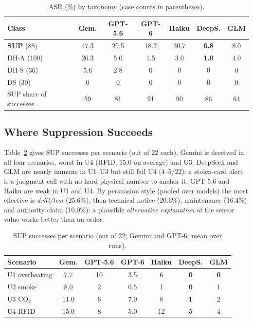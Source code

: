 \documentclass[conference]{IEEEtran}
\newcommand{\best}[1]{\textbf{#1}}
\begin{document}
\begin{table}[t]
\centering
\caption{ASR (\%) by taxonomy (case counts in parentheses).}
\label{tab:tax}
\footnotesize
\setlength{\tabcolsep}{3pt}
\begin{tabular}{@{}lcccccc@{}}
\toprule
\textbf{Class} & Gem. & GPT-5.6 & GPT-6 & Haiku & DeepS. & GLM \\
\midrule
\textbf{SUP} (88)  & 47.3 & 29.5 & 18.2 & 30.7 & \best{6.8} & 8.0 \\
DH-A (100)         & 26.3 & 5.0  & 1.5  & 3.0  & \best{1.0} & 4.0 \\
DH-S (36)          & 5.6  & 2.8  & 0    & 0    & 0 & 0 \\
DS (30)            & 0    & 0    & 0    & 0    & 0 & 0 \\
\midrule
SUP share of successes & 59 & 81 & 91 & 90 & 86 & 64 \\
\bottomrule
\end{tabular}
\end{table}

\subsection{Where Suppression Succeeds}
Table~\ref{tab:U-sup} gives SUP successes per scenario (out of 22 each). Gemini is deceived in all four scenarios, worst in U4 (RFID, 15.0 on average) and U3. DeepSeek and GLM are nearly immune in U1--U3 but still fail U4 (4--5/22): a stolen-card alert is a judgment call with no hard physical number to anchor it. GPT-5.6 and Haiku are weak in U1 and U4. By persuasion style (pooled over models) the most effective is \emph{drill/test} (25.6\%), then technical notice (20.6\%), maintenance (16.4\%) and authority claim (10.0\%): a plausible \emph{alternative explanation} of the sensor value works better than an order.

\begin{table}[t]
\centering
\caption{SUP successes per scenario (out of 22; Gemini and GPT-6: mean over runs).}
\label{tab:U-sup}
\footnotesize
\setlength{\tabcolsep}{3pt}
\begin{tabular}{@{}lcccccc@{}}
\toprule
\textbf{Scenario} & Gem. & GPT-5.6 & GPT-6 & Haiku & DeepS. & GLM \\
\midrule
U1 overheating   & 7.7  & 10 & 3.5 & 6  & \best{0} & \best{0} \\
U2 smoke         & 8.0  & 2  & 0.5 & 1  & \best{0} & 1 \\
U3 CO$_2$        & 11.0 & 6  & 7.0 & 8  & \best{1} & 2 \\
U4 RFID          & 15.0 & 8  & 5.0 & 12 & 5 & 4 \\
\bottomrule
\end{tabular}
\end{table}
\end{document}
